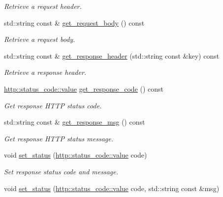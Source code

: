 \begin{DoxyCompactItemize}
\begin{DoxyCompactList}\small\item\em Retrieve a request header. \end{DoxyCompactList}\item 
std\+::string const \& \hyperlink{classwebsocketpp_1_1connection_ab50df430aa86417e50df8959d5e3e79d}{get\+\_\+request\+\_\+body} () const 
\begin{DoxyCompactList}\small\item\em Retrieve a request body. \end{DoxyCompactList}\item 
std\+::string const \& \hyperlink{classwebsocketpp_1_1connection_a1b6c2b2b36d1b8c6e59ef95474a381fe}{get\+\_\+response\+\_\+header} (std\+::string const \&key) const 
\begin{DoxyCompactList}\small\item\em Retrieve a response header. \end{DoxyCompactList}\item 
\hyperlink{namespacewebsocketpp_1_1http_1_1status__code_ae0d61c309e053ee5673517b54e2886c6}{http\+::status\+\_\+code\+::value} \hyperlink{classwebsocketpp_1_1connection_ac7b863cdabbea139117819e58e1fcf7a}{get\+\_\+response\+\_\+code} () const 
\begin{DoxyCompactList}\small\item\em Get response H\+T\+T\+P status code. \end{DoxyCompactList}\item 
std\+::string const \& \hyperlink{classwebsocketpp_1_1connection_ac80a14160257f7ad74bc6c30de0564c7}{get\+\_\+response\+\_\+msg} () const 
\begin{DoxyCompactList}\small\item\em Get response H\+T\+T\+P status message. \end{DoxyCompactList}\item 
void \hyperlink{classwebsocketpp_1_1connection_a96d445ff0cc75b854c4500e93a054acb}{set\+\_\+status} (\hyperlink{namespacewebsocketpp_1_1http_1_1status__code_ae0d61c309e053ee5673517b54e2886c6}{http\+::status\+\_\+code\+::value} code)
\begin{DoxyCompactList}\small\item\em Set response status code and message. \end{DoxyCompactList}\item 
void \hyperlink{classwebsocketpp_1_1connection_a97b4513339167df8653a11ef3ccc65b1}{set\+\_\+status} (\hyperlink{namespacewebsocketpp_1_1http_1_1status__code_ae0d61c309e053ee5673517b54e2886c6}{http\+::status\+\_\+code\+::value} code, std\+::string const \&msg)

\end{DoxyCompactItemize}
